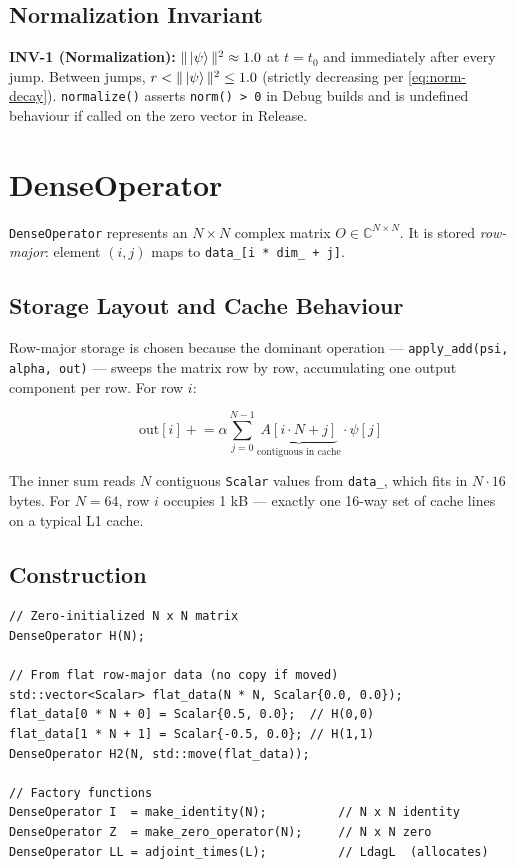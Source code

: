 \documentclass[11pt,a4paper,twoside]{book}
\newcommand{\complex}{\mathbb{C}}
\newcommand{\code}[1]{\texttt{\small#1}}
\theoremstyle{definition}
\theoremstyle{remark}
\begin{document}
\subsection{Normalization Invariant}
\label{subsec:sv-norm-invariant}

\begin{invbox}
  \textbf{INV-1 (Normalization):}
  $\|\ket{\psi}\|^2 \approx 1.0$ at $t = t_0$ and immediately after
  every jump. Between jumps, $r < \|\ket{\psi}\|^2 \leq 1.0$
  (strictly decreasing per \cref{eq:norm-decay}).
  \code{normalize()} asserts \code{norm() > 0} in Debug builds and
  is undefined behaviour if called on the zero vector in Release.
\end{invbox}

\section{DenseOperator}
\label{sec:denseoperator}

\code{DenseOperator} represents an $N \times N$ complex matrix
$O \in \complex^{N \times N}$. It is stored \emph{row-major}:
element $(i, j)$ maps to \code{data\_[i * dim\_ + j]}.

\subsection{Storage Layout and Cache Behaviour}
\label{subsec:dense-storage}

Row-major storage is chosen because the dominant operation —
\code{apply\_add(psi, alpha, out)} — sweeps the matrix
row by row, accumulating one output component per row.
For row $i$:

\begin{equation}
  \text{out}[i] \mathrel{+}= \alpha \sum_{j=0}^{N-1}
    \underbrace{A[i \cdot N + j]}_{\text{contiguous in cache}}
    \cdot \psi[j]
  \label{eq:matvec-row}
\end{equation}

The inner sum reads $N$ contiguous \code{Scalar} values from
\code{data\_}, which fits in $N \cdot 16$ bytes. For $N = 64$,
row $i$ occupies 1 kB — exactly one 16-way set of cache lines
on a typical L1 cache.

\subsection{Construction}
\label{subsec:dense-construction}

\begin{verbatim}
// Zero-initialized N x N matrix
DenseOperator H(N);

// From flat row-major data (no copy if moved)
std::vector<Scalar> flat_data(N * N, Scalar{0.0, 0.0});
flat_data[0 * N + 0] = Scalar{0.5, 0.0};  // H(0,0)
flat_data[1 * N + 1] = Scalar{-0.5, 0.0}; // H(1,1)
DenseOperator H2(N, std::move(flat_data));

// Factory functions
DenseOperator I  = make_identity(N);          // N x N identity
DenseOperator Z  = make_zero_operator(N);     // N x N zero
DenseOperator LL = adjoint_times(L);          // LdagL  (allocates)
\end{verbatim}
\end{document}
